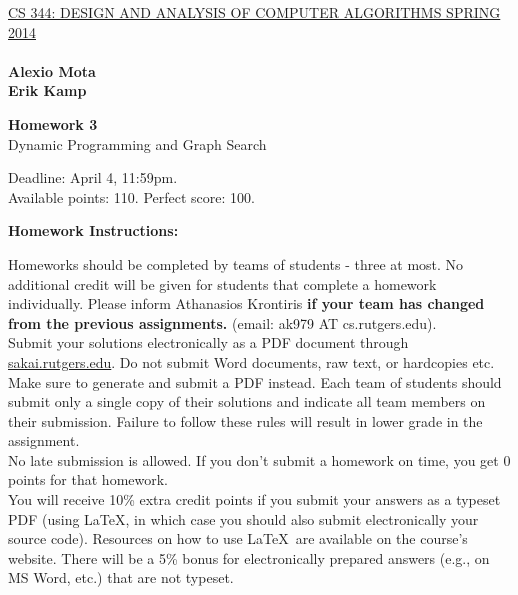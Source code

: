 \documentclass{article}
\begin{document}
\sloppy

\noindent \underline{CS 344: DESIGN AND ANALYSIS OF COMPUTER
  ALGORITHMS \hspace{1.6in} SPRING 2014}\\

\\
{\bf {\large Alexio Mota}}\\
{\bf {\large Erik Kamp}}\\

\vspace{0.1in}

\begin{center}
{\bf {\large Homework 3}}\\
Dynamic Programming and Graph Search\\
\end{center}

\vspace{0.1in}

\noindent Deadline: April 4, 11:59pm.\\ 
Available points: 110. Perfect score: 100.\\

\begin{center}
{\bf Homework Instructions:}
\end{center}

 Homeworks should be completed by teams of
students - three at most. No additional credit will be given for
students that complete a homework individually. Please inform
Athanasios Krontiris {\bf if your team has changed from the previous
  assignments.} (email: ak979 AT cs.rutgers.edu).\\

 Submit your solutions electronically
as a PDF document through \url{sakai.rutgers.edu}. Do not submit Word
documents, raw text, or hardcopies etc. Make sure to generate and
submit a PDF instead. Each team of students should submit only a
single copy of their solutions and indicate all team members on their
submission.  Failure to follow these rules will result in lower grade
in the assignment.\\

 No late submission is allowed. If
you don't submit a homework on time, you get 0 points for that
homework.\\

 You will receive 10\% extra
credit points if you submit your answers as a typeset PDF (using
\LaTeX, in which case you should also submit electronically your
source code). Resources on how to use \LaTeX\ are available on the
course's website. There will be a 5\% bonus for electronically
prepared answers (e.g., on MS Word, etc.) that are not typeset.\\
\end{document}
